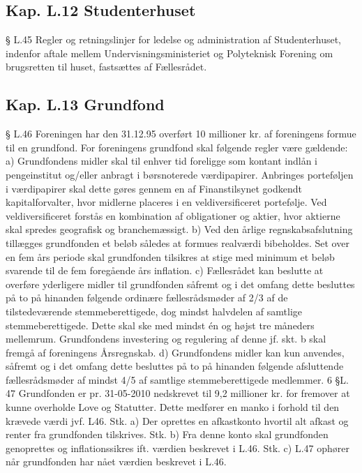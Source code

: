 \begin{list}
\subsection{Kap. L.12 Studenterhuset}
§ L.45
Regler og retningslinjer for ledelse og administration af Studenterhuset, indenfor aftale mellem
Undervisningsministeriet og Polyteknisk Forening om brugsretten til huset, fastsættes af Fællesrådet.
\subsection{Kap. L.13 Grundfond}
§ L.46
Foreningen har den 31.12.95 overført 10 millioner kr. af foreningens formue til en grundfond.
For foreningens grundfond skal følgende regler være gældende:
a) Grundfondens midler skal til enhver tid foreligge som kontant indlån i pengeinstitut og/eller anbragt i
børsnoterede værdipapirer. Anbringes porteføljen i værdipapirer skal dette gøres gennem en af
Finanstilsynet godkendt kapitalforvalter, hvor midlerne placeres i en veldiversificeret portefølje. Ved
veldiversificeret forstås en kombination af obligationer og aktier, hvor aktierne skal spredes geografisk
og branchemæssigt.
b) Ved den årlige regnskabsafslutning tillægges grundfonden et beløb således at formues realværdi
bibeholdes. Set over en fem års periode skal grundfonden tilsikres at stige med minimum et beløb
svarende til de fem foregående års inflation.
c) Fællesrådet kan beslutte at overføre yderligere midler til grundfonden såfremt og i det omfang dette
besluttes på to på hinanden følgende ordinære fællesrådsmøder af 2/3 af de tilstedeværende
stemmeberettigede, dog mindst halvdelen af samtlige stemmeberettigede. Dette skal ske med mindst én
og højst tre måneders mellemrum. Grundfondens investering og regulering af denne jf. skt. b skal fremgå
af foreningens Årsregnskab.
d) Grundfondens midler kan kun anvendes, såfremt og i det omfang dette besluttes på to på hinanden
følgende afsluttende fællesrådsmøder af mindst 4/5 af samtlige stemmeberettigede medlemmer.
6
§L. 47
Grundfonden er pr. 31-05-2010 nedskrevet til 9,2 millioner kr. for fremover at kunne overholde Love og
Statutter. Dette medfører en manko i forhold til den krævede værdi jvf. L46.
Stk. a) Der oprettes en afkastkonto hvortil alt afkast og renter fra grundfonden tilskrives.
Stk. b) Fra denne konto skal grundfonden genoprettes og inflationssikres ift. værdien beskrevet i L.46.
Stk. c) L.47 ophører når grundfonden har nået værdien beskrevet i L.46.

\end{list}
